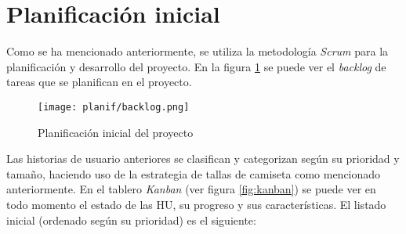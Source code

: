 \section{Planificación inicial}\label{sec:planif_inicial}
Como se ha mencionado anteriormente, se utiliza la metodología \textit{Scrum}
para la planificación y desarrollo del proyecto. En la figura \ref{fig:backlog}
se puede ver el \textit{backlog} de tareas que se planifican en el proyecto.

\begin{figure}[H]
	\centering
	\texttt{[image: planif/backlog.png]}
	\caption{Planificación inicial del proyecto}
	\label{fig:backlog}
\end{figure}

Las historias de usuario anteriores se clasifican y categorizan según su
prioridad y tamaño, haciendo uso de la estrategia de tallas de camiseta como
mencionado anteriormente. En el tablero \textit{Kanban}
(ver figura \ref{fig:kanban}) se puede ver en todo momento el estado de las HU,
su progreso y sus características. El listado inicial (ordenado según su prioridad)
es el siguiente:

